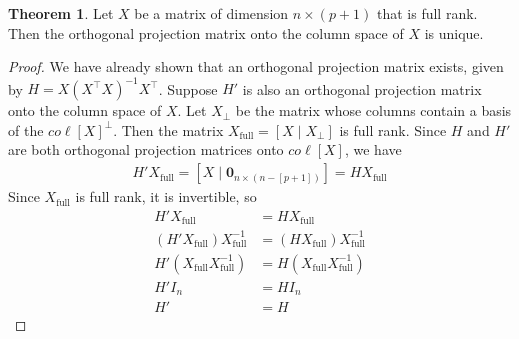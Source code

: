\documentclass[12pt, a4paper]{article}
\theoremstyle{definition}
\newtheorem{theorem}{Theorem}
\begin{document}
	\begin{tcolorbox}[breakable]
		\begin{theorem}
			\label{thm:ortho-proj-mat-unique}
			Let $X$ be a matrix of dimension $n\times (p+1)$ that is full rank. Then
			the orthogonal projection matrix onto the column space of $X$ is unique.
		\end{theorem}
		\begin{proof}
			We have already shown that an orthogonal projection matrix exists,
			given by $H=X(X^\top X)^{-1}X^\top$. Suppose $H'$ is also an orthogonal
			projection matrix onto the column space of $X$. Let $X_{\perp}$ be the
			matrix whose columns contain a basis of the $co\ell[X]^\perp$.
			Then the matrix $X_{\text{full}}=[X\mid X_\perp]$ is full rank.
			Since $H$ and $H'$ are both orthogonal projection matrices onto
			$co\ell[X]$, we have
			\begin{align*}
				H'X_{\text{full}}=[X \mid \mathbf{0}_{n\times (n-[p+1])}]=HX_\text{full}
			\end{align*}
			Since $X_{\text{full}}$ is full rank, it is invertible, so
			\begin{align*}
				H'X_{\text{full}} &= HX_{\text{full}}\\
				(H'X_{\text{full}})X_{\text{full}}^{-1} &= (HX_{\text{full}})X_{\text{full}}^{-1}\\
				H'(X_{\text{full}}X_{\text{full}}^{-1}) &= H(X_{\text{full}}X_{\text{full}}^{-1})\\
				H'I_{n} &= H I_n
				\tag{$I_n$ is the identity matrix}\\
				H'&=H
			\end{align*}
		\end{proof}
	\end{tcolorbox}
\end{document}
